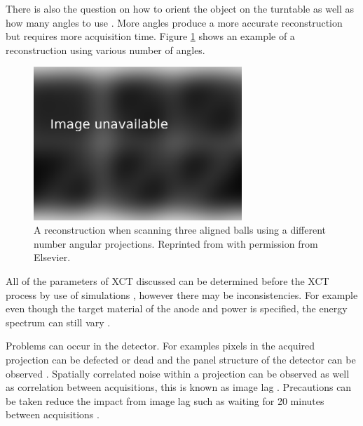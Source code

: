 There is also the question on how to orient the object on the turntable \citep{corcoran2016observations} as well as how many angles to use \citep{kruth2011computed}. More angles produce a more accurate reconstruction but requires more acquisition time. Figure \ref{fig:literature_angles} shows an example of a reconstruction using various number of angles.

\begin{figure}
  \centering
  \includegraphics[width=0.7\textwidth]{../figures/literatureReview/literature_angles.png}
  \caption{A reconstruction when scanning three aligned balls using a different number angular projections. Reprinted from \cite{kruth2011computed} with permission from Elsevier.}
  \label{fig:literature_angles}
\end{figure}

All of the parameters of XCT discussed can be determined before the XCT process by use of simulations \citep{reisinger2011simulation, reiter2011simulation}, however there may be inconsistencies. For example even though the target material of the anode and power is specified, the energy spectrum can still vary \citep{stumbo2004direct}.

Problems can occur in the detector. For examples pixels in the acquired projection can be defected or dead \citep{brettschneider2014spatial} and the panel structure of the detector can be observed \citep{yang2009evaluation}. Spatially correlated noise within a projection can be observed \citep{sun2016characterisation} as well as correlation between acquisitions, this is known as image lag \citep{yang2009evaluation}. Precautions can be taken reduce the impact from image lag such as waiting for 20 minutes between acquisitions \citep{yang2010noise}.

